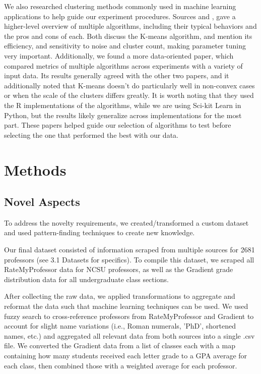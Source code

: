 \documentclass[sigconf,nonacm]{acmart}
\begin{document}
We also researched clustering methods commonly used in machine learning applications to help guide our experiment procedures. Sources \cite{Abbas2005:sourceA} and \cite{Xu2015:sourceC}, gave a higher-level overview of multiple algorithms, including their typical behaviors and the pros and cons of each. Both discuss the K-means algorithm, and mention its efficiency, and sensitivity to noise and cluster count, making parameter tuning very important. Additionally, we found a more data-oriented paper, \cite{10.1371/journal.pone.0210236:sourceB} which compared metrics of multiple algorithms across experiments with a variety of input data. Its results generally agreed with the other two papers, and it additionally noted that K-means doesn't do particularly well in non-convex cases or when the scale of the clusters differs greatly. It is worth noting that they used the R implementations of the algorithms, while we are using Sci-kit Learn in Python, but the results likely generalize across implementations for the most part. These papers helped guide our selection of algorithms to test before selecting the one that performed the best with our data.

\section{Methods}

\subsection{Novel Aspects}
To address the novelty requirements, we created/transformed a custom dataset and used pattern-finding techniques to create new knowledge.

Our final dataset consisted of information scraped from multiple sources for 2681 professors (see 3.1 Datasets for specifics). To compile this dataset, we scraped all RateMyProfessor data for NCSU professors, as well as the Gradient grade distribution data for all undergraduate class sections.

After collecting the raw data, we applied transformations to aggregate and reformat the data such that machine learning techniques can be used. We used fuzzy search to cross-reference professors from RateMyProfessor and Gradient to account for slight name variations (i.e., Roman numerals, 'PhD', shortened names, etc.) and aggregated all relevant data from both sources into a single .csv file. We converted the Gradient data from a list of classes each with a map containing how many students received each letter grade to a GPA average for each class, then combined those with a weighted average for each professor.
\end{document}

